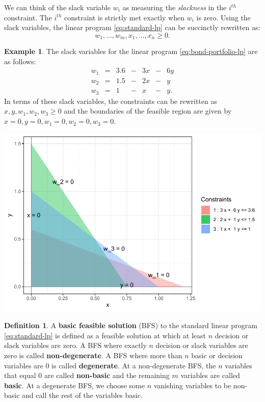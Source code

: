 \documentclass[
]{book}
\theoremstyle{definition}
\newtheorem{definition}{Definition}[chapter]
\theoremstyle{definition}
\newtheorem{example}{Example}[chapter]
\theoremstyle{definition}
\theoremstyle{definition}
\theoremstyle{remark}
\begin{document}
We can think of the slack variable \(w_i\) as measuring the \emph{slackness} in the \(i^{th}\) constraint. The \(i^{th}\) constraint is strictly met exactly when \(w_i\) is zero. Using the slack variables, the linear program \eqref{eq:standard-lp} can be succinctly rewritten as:
\begin{equation*}
  w_1, \dots, w_m, x_1, \dots, x_n \geq 0.
\end{equation*}

\begin{example}
The slack variables for the linear program \eqref{eq:bond-portfolio-lp} are as follows:
\begin{equation*}
  \begin{array}{rlllllll}
  w_1 & = & 3.6 & - & 3x & - & 6y \\
  w_2 & = & 1.5 & - & 2x & - & y \\
  w_3 & = & 1 & - & x & - & y.
  \end{array}
\end{equation*}
In terms of these slack variables, the constraints can be rewritten as \(x, y, w_1, w_2, w_3 \ge 0\) and the boundaries of the feasible region are given by \(x = 0, y = 0, w_1 = 0, w_2 = 0, w_3 = 0\).

\includegraphics{Introduction-to-Optimization_files/figure-latex/fig-bond-portfolio-slack-1.pdf}
\end{example}

\begin{definition}
\protect\hypertarget{def:degeneracy}{}\label{def:degeneracy}A \textbf{basic feasible solution} (BFS) to the standard linear program \eqref{eq:standard-lp} is defined as a feasible solution at which at least \(n\) decision or slack variables are zero. A BFS where exactly \(n\) decision or slack variables are zero is called \textbf{non-degenerate}. A BFS where more than \(n\) basic or decision variables are 0 is called \textbf{degenerate}. At a non-degenerate BFS, the \(n\) variables that equal 0 are called \textbf{non-basic} and the remaining \(m\) variables are called \textbf{basic}.
At a degenerate BFS, we choose some \(n\) vanishing variables to be non-basic and call the rest of the variables basic.
\end{definition}
\end{document}
